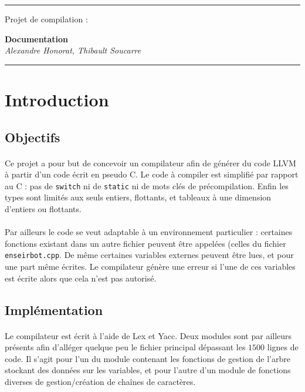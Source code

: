 \documentclass[a4paper,10pt]{article}
\begin{document}
\vspace{2cm}
\hrule
\begin{flushleft}
\LARGE{Projet de compilation :}\\
\end{flushleft}
\begin{flushright}
\huge\textbf{Documentation}\\
\LARGE\textit{Alexandre Honorat, Thibault Soucarre}
\end{flushright}
\hrule
\vspace{4cm}

\tableofcontents


\newpage
\section{Introduction}

\subsection{Objectifs}

\paragraph{}
Ce projet a pour but de concevoir un compilateur afin de générer du code \textsf{LLVM} à partir d'un code écrit en pseudo \textsf{C}. Le code à compiler est simplifié par rapport au \textsf{C} : pas de \verb!switch! ni de \verb!static! ni de mots clés de précompilation. Enfin les types sont limités aux seuls entiers, flottants, et tableaux à une dimension d'entiers ou flottants. 

\paragraph{}
Par ailleurs le code se veut adaptable à un environnement particulier : certaines fonctions existant dans un autre fichier peuvent être appelées (celles du fichier \verb!enseirbot.cpp!. De même certaines variables externes peuvent être lues, et pour une part même écrites. Le compilateur génère une erreur si l'une de ces variables est écrite alors que cela n'est pas autorisé.

\subsection{Implémentation}

\paragraph{}
Le compilateur est écrit à l'aide de \textsf{Lex} et \textsf{Yacc}. Deux modules sont par ailleurs présents afin d'alléger quelque peu le fichier principal dépassant les $1500$ lignes de code. Il s'agit pour l'un du module contenant les fonctions de gestion de l'arbre stockant des données sur les variables, et pour l'autre d'un module de fonctions diverses de gestion/création de chaînes de caractères.
\end{document}
